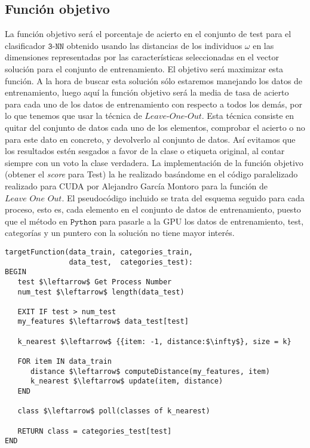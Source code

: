 \documentclass[11pt,leqno]{article}
\begin{document}
\subsection{Función objetivo}
	La función objetivo será el porcentaje de acierto en el conjunto de test para el clasificador $\texttt{3-NN}$ obtenido usando las distancias de los individuos $\omega$ en las dimensiones representadas por las características seleccionadas en el vector solución para el conjunto de entrenamiento. 
	El objetivo será maximizar esta función. A la hora de buscar esta solución sólo estaremos manejando los datos de entrenamiento, luego aquí la función objetivo será la media de tasa de acierto para cada uno de los datos de entrenamiento con respecto a todos los demás, por lo que tenemos que usar la técnica de $\textit{Leave-One-Out}$. 
	Esta técnica consiste en quitar del conjunto de datos cada uno de los elementos, comprobar el acierto o no para este dato en concreto, y devolverlo al conjunto de datos. Así evitamos que los resultados estén sesgados a favor de la clase o etiqueta original, al contar siempre con un voto la clase verdadera.
	\newpage
	La implementación de la función objetivo (obtener el \textit{score} para Test) la he realizado basándome en el código paralelizado realizado para CUDA por Alejandro García Montoro para la función de $\textit{Leave One Out}$. El pseudocódigo incluido se trata del esquema seguido para cada proceso, esto es, cada elemento en el conjunto de datos de entrenamiento, puesto que el método en $\texttt{Python}$ para pasarle a la GPU los datos de entrenamiento, test, categorías y un puntero con la solución no tiene mayor interés.
	
\begin{lstlisting}[mathescape=true]
targetFunction(data_train, categories_train, 
               data_test,  categories_test):
BEGIN
   test $\leftarrow$ Get Process Number
   num_test $\leftarrow$ length(data_test)
   
   EXIT IF test > num_test
   my_features $\leftarrow$ data_test[test]
   
   k_nearest $\leftarrow$ {{item: -1, distance:$\infty$}, size = k}
	
   FOR item IN data_train
      distance $\leftarrow$ computeDistance(my_features, item)
      k_nearest $\leftarrow$ update(item, distance)
   END
	
   class $\leftarrow$ poll(classes of k_nearest)
      
   RETURN class = categories_test[test]
END
\end{lstlisting}
\end{document}
